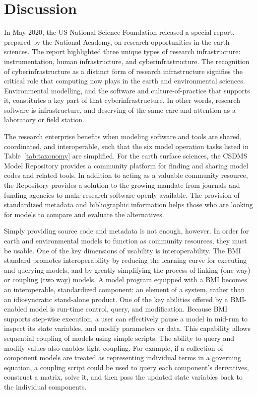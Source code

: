 \documentclass[12pt]{amsart}
\begin{document}
\section{Discussion}
\label{sec:discussion}

In May 2020, the US National Science Foundation released a special report, prepared by the National Academy, on research opportunities in the earth sciences. The report highlighted three unique types of research infrastructure: instrumentation, human infrastructure, and cyberinfrastructure. The recognition of cyberinfrastructure as a distinct form of research infrastructure signifies the critical role that computing now plays in the earth and environmental sciences. Environmental modelling, and the software and culture-of-practice that supports it, constitutes a key part of that cyberinfrastructure. In other words, research software is infrastructure, and deserving of the same care and attention as a laboratory or field station.

The research enterprise benefits when modeling  software and tools are shared, coordinated, and interoperable, such that the six model operation tasks listed in Table~\ref{tab:taxonomy} are simplified. For the earth surface sciences, the CSDMS Model Repository provides a community platform for finding and sharing model codes and related tools. In addition to acting as a valuable community resource, the Repository provides a solution to the growing mandate from journals and funding agencies to make research software openly available. The provision of standardized metadata and bibliographic information helps those who are looking for models to compare and evaluate the alternatives.

Simply providing source code and metadata is not enough, however. In order for earth and environmental models to function as community resources, they must be usable. One of the key dimensions of usability is interoperability. The BMI standard promotes interoperability by reducing the learning curve for executing and querying models, and by greatly simplifying the process of linking (one way) or coupling (two way) models. A model program equipped with a BMI becomes an interoperable, standardized component: an element of a system, rather than an idiosyncratic stand-alone product. One of the key abilities offered by a BMI-enabled model is run-time control, query, and modification. Because BMI supports step-wise execution, a user can effectively pause a model in mid-run to inspect its state variables, and modify parameters or data. This capability allows sequential coupling of models using simple scripts. The ability to query and modify values also enables tight coupling. For example, if a collection of component models are treated as representing individual terms in a governing equation, a coupling script could be used to query each component's derivatives, construct a matrix, solve it, and then pass the updated state variables back to the individual components.
\end{document}

